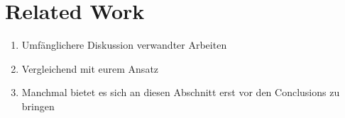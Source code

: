 \section{Related Work}

\begin{enumerate}
	\item Umfänglichere Diskussion verwandter Arbeiten
	\item Vergleichend mit eurem Ansatz
	\item Manchmal bietet es sich an diesen Abschnitt erst vor den Conclusions zu bringen
\end{enumerate}
